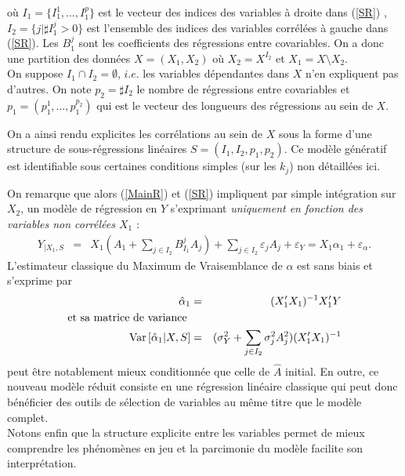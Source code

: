 \documentclass[12pt]{article}
\begin{document}
où %
$I_1=\{I_1^1,\dots,I_1^{p}\}$ est le vecteur des indices des variables à droite dans (\ref{SR}) , $I_2=\{j |\sharp I_1^j>0 \}$ est l'ensemble des indices des variables corrélées à gauche dans (\ref{SR}). Les $B_1^j$ sont les coefficients des régressions entre covariables. On a donc une partition des données $X=(X_1,X_2)$ où $X_2=X^{I_2}$ et $X_1=X\setminus X_2$.\\
On suppose $I_1\cap I_2=\emptyset$, $i.e.$ les variables dépendantes dans $X$ n'en expliquent pas d'autres.
On note $p_2= \sharp I_2$ le nombre de régressions entre covariables et $p_1=(p_1^1,\dots,p_1^{p_2})$ qui est le vecteur des longueurs des régressions au sein de $X$.
	
On a ainsi rendu explicites les corrélations au sein de $X$ sous la forme d'une structure de sous-régressions linéaires $S=(I_1,I_2,p_1,p_2)$.	
Ce modèle génératif est identifiable sous certaines conditions simples (sur les $k_j$) non détaillées ici.

On remarque que alors (\ref{MainR}) et (\ref{SR}) impliquent par simple intégration sur $X_2$, un modèle de régression en $Y$ s'exprimant {\it uniquement en fonction des variables non corrélées $X_1$} :
\begin{eqnarray}
	Y_{|X_1,S}&=&X_1 (A_{1}+ \sum_{j \in I_2}B^{j}_{I_1}A_{j})+  \sum_{j \in I_2}\varepsilon_{j}A_{j}+\varepsilon_Y 
					= X_1\alpha_{1}+ \varepsilon_{\alpha}. \label{Trueexpl} 			
\end{eqnarray}		
L'estimateur classique du Maximum de Vraisemblance de $\alpha$ est sans biais et s'exprime par	
\begin{eqnarray}
	\hat{\alpha}_{1}&=& (X'_{1} X_1)^{-1}X'_{1}Y  \\
\textrm{et sa matrice de variance } && \nonumber \\
	{\rm Var}\,[\hat{\alpha}_{1}|X,S]&=& (\sigma^2_Y+\sum_{j \in I_2}\sigma^2_{j}A_{j}^2 )(X'_{1} X_{1})^{-1}
\end{eqnarray}
		peut être notablement mieux conditionnée que celle de $\hat A$ initial.						
	En outre, ce nouveau modèle réduit consiste en une régression linéaire classique qui peut donc bénéficier des outils de sélection de variables au même titre que le modèle complet.			
		 \\		
		 Notons enfin que la structure explicite entre les variables permet de mieux comprendre les phénomènes en jeu et la parcimonie du modèle facilite son interprétation. 
\\ 
\end{document}
